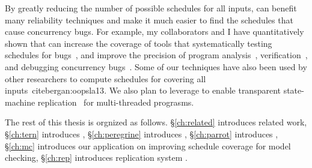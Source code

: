 By greatly reducing the number of possible schedules for all inputs, \smt can benefit many reliability 
techniques and make it much easier to find the schedules that cause concurrency 
bugs. For example, my collaborators and I have quantitatively shown that \smt can 
increase the coverage of tools that systematically testing schedules for 
bugs~\cite{parrot:sosp13, dbug:spin11, modist:nsdi09}, and improve the precision 
of program analysis~\cite{wu:pldi12}, verification~\cite{wu:pldi12}, and 
debugging concurrency bugs~\cite{cui:tern:osdi10}. Some of our \smt techniques have 
also been used by other researchers to compute schedules for covering all 
inputs~cite{bergan:oopsla13}. We also plan to leverage \smt to enable transparent 
state-machine replication~\cite{paxos} for multi-threaded prograsms.


The rest of this thesis is orgnized as follows. \S\ref{ch:related} introduces 
related work, \S\ref{ch:tern} introduces \tern, \S\ref{ch:peregrine} introduces 
\peregrine, \S\ref{ch:parrot} introduces \parrot, \S\ref{ch:mc} introduces our 
application on improving schedule coverage for model checking, \S\ref{ch:rep} introduces replication system \msmr.

